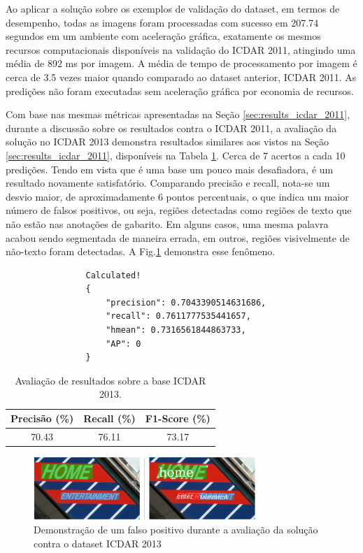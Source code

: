 Ao aplicar a solução sobre os exemplos de validação do dataset, em termos de desempenho, todas as imagens foram processadas com sucesso em 207.74 segundos em um ambiente com aceleração gráfica, exatamente os mesmos recursos computacionais disponíveis na validação do ICDAR 2011, atingindo uma média de 892 ms por imagem. A média de tempo de processamento por imagem é cerca de 3.5 vezes maior quando comparado ao dataset anterior, ICDAR 2011.  As predições não foram executadas sem aceleração gráfica por economia de recursos.

Com base nas mesmas métricas apresentadas na Seção \ref{sec:results_icdar_2011}, durante a discussão sobre os resultados contra o ICDAR 2011, a avaliação da solução no ICDAR 2013 demonstra resultados similares aos vistos na Seção \ref{sec:results_icdar_2011}, disponíveis na Tabela \ref{tab:icdar13_results}. Cerca de 7 acertos a cada 10 predições. Tendo em vista que é uma base um pouco mais desafiadora, é um resultado novamente satisfatório. Comparando precisão e recall, nota-se um desvio maior, de aproximadamente 6 pontos percentuais, o que indica um maior número de falsos positivos, ou seja, regiões detectadas como regiões de texto que não estão nas anotações de gabarito. Em alguns casos, uma mesma palavra acabou sendo segmentada de maneira errada, em outros, regiões visivelmente de não-texto foram detectadas. A Fig.\ref{fig:results_icdar13_01} demonstra esse fenômeno.


\begin{verbatim}
                Calculated!
                {
                    "precision": 0.7043390514631686,
                    "recall": 0.7611777535441657,
                    "hmean": 0.7316561844863733, 
                    "AP": 0
                }
\end{verbatim}

\begin{table}[htb]
    \centering
    \caption{Avaliação de resultados sobre a base ICDAR 2013.}
    \begin{tabular}{|c|c|c|}
        \hline
        Precisão (\%) & Recall (\%) & F1-Score (\%) \\
        \hline
        70.43 & 76.11 & 73.17\\
        \hline
    \end{tabular}
    \label{tab:icdar13_results}
\end{table}

\begin{figure}
    \centering
    \includegraphics[width=0.75\textwidth]{figs/resultados-icdar13-01.png}
    \caption{Demonstração de um falso positivo durante a avaliação da solução contra o dataset ICDAR 2013}
    \label{fig:results_icdar13_01}
\end{figure}

